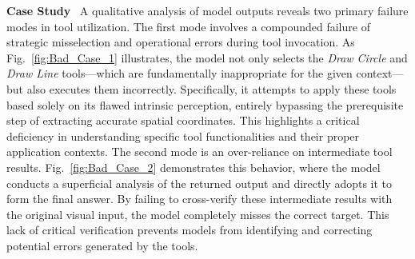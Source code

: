 \documentclass[runningheads]{llncs}
\begin{document}
\noindent \textbf{Case Study}~\label{sec:case_study}
A qualitative analysis of model outputs reveals two primary failure modes in tool utilization. The first mode involves a compounded failure of strategic misselection and operational errors during tool invocation. As Fig.~\ref{fig:Bad_Case_1} illustrates, the model not only selects the \textit{Draw Circle} and \textit{Draw Line} tools—which are fundamentally inappropriate for the given context—but also executes them incorrectly. Specifically, it attempts to apply these tools based solely on its flawed intrinsic perception, entirely bypassing the prerequisite step of extracting accurate spatial coordinates. This highlights a critical deficiency in understanding specific tool functionalities and their proper application contexts. The second mode is an over-reliance on intermediate tool results. Fig.~\ref{fig:Bad_Case_2} demonstrates this behavior, where the model conducts a superficial analysis of the returned output and directly adopts it to form the final answer. By failing to cross-verify these intermediate results with the original visual input, the model completely misses the correct target. This lack of critical verification prevents models from identifying and correcting potential errors generated by the tools.
\end{document}
